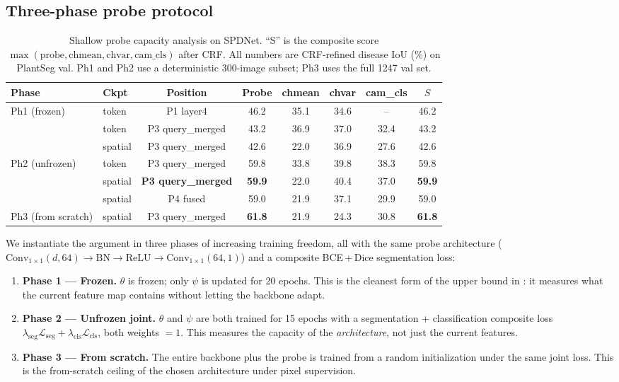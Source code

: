 \documentclass[11pt,a4paper]{article}
\newcommand{\Lcls}{\mathcal{L}_{\mathrm{cls}}}
\begin{document}
\subsection{Three-phase probe protocol}

\begin{table}[t]
\centering
\small
\caption{Shallow probe capacity analysis on SPDNet. ``S'' is the
composite score $\max(\text{probe},\text{chmean},\text{chvar},\text{cam\_cls})$
after CRF. All numbers are CRF-refined disease IoU (\%) on PlantSeg val.
Ph1 and Ph2 use a deterministic 300-image subset; Ph3 uses the full
1247 val set.}
\label{tab:probe}
\begin{tabular}{@{}llcccccc@{}}
\toprule
Phase & Ckpt & Position & Probe & chmean & chvar & cam\_cls & $S$\\
\midrule
Ph1 (frozen) & token     & P1 layer4              & 46.2 & 35.1 & 34.6 & --   & 46.2\\
             & token     & P3 query\_merged       & 43.2 & 36.9 & 37.0 & 32.4 & 43.2\\
             & spatial   & P3 query\_merged       & 42.6 & 22.0 & 36.9 & 27.6 & 42.6\\
\midrule
Ph2 (unfrozen)&token     & P3 query\_merged       & 59.8 & 33.8 & 39.8 & 38.3 & 59.8\\
             & spatial   & \textbf{P3 query\_merged}&\textbf{59.9}& 22.0 & 40.4 & 37.0 & \textbf{59.9}\\
             & spatial   & P4 fused               & 59.0 & 21.9 & 37.1 & 29.9 & 59.0\\
\midrule
Ph3 (from scratch) & spatial & P3 query\_merged   & \textbf{61.8} & 21.9 & 24.3 & 30.8 & \textbf{61.8}\\
\bottomrule
\end{tabular}
\end{table}

We instantiate the argument in three phases of increasing training
freedom, all with the same probe architecture
($\mathrm{Conv}_{1\!\times\!1}(d,64)\!\to\!\mathrm{BN}\!\to\!\mathrm{ReLU}\!\to\!\mathrm{Conv}_{1\!\times\!1}(64,1)$)
and a composite BCE\,+\,Dice segmentation loss:

\begin{enumerate}[leftmargin=*,itemsep=1pt]
\item \textbf{Phase 1 — Frozen.} $\theta$ is frozen; only $\psi$ is
updated for 20 epochs. This is the cleanest form of the upper bound in
: it measures what the current feature map contains
without letting the backbone adapt.
\item \textbf{Phase 2 — Unfrozen joint.} $\theta$ and $\psi$ are both
trained for 15 epochs with a segmentation + classification composite
loss $\lambda_{\mathrm{seg}}\mathcal{L}_{\mathrm{seg}}
+\lambda_{\mathrm{cls}}\Lcls$, both weights $=1$. This measures the
capacity of the \emph{architecture}, not just the current features.
\item \textbf{Phase 3 — From scratch.} The entire backbone plus the
probe is trained from a random initialization under the same joint loss.
This is the from-scratch ceiling of the chosen architecture under pixel
supervision.
\end{enumerate}
\end{document}
